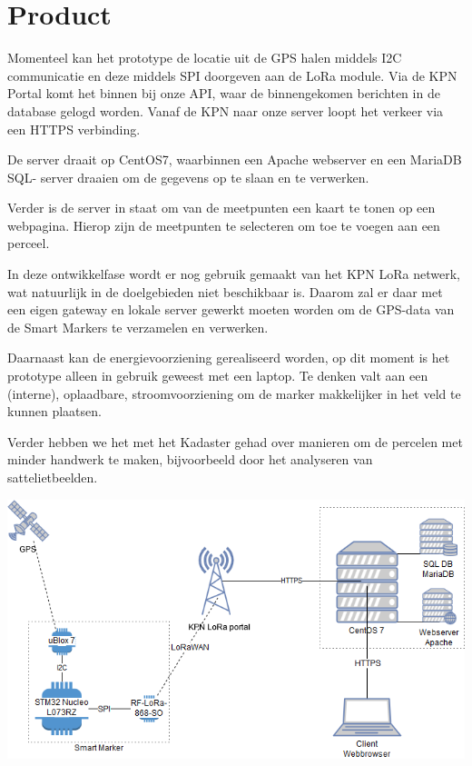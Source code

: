 \section{Product}
Momenteel kan het prototype de locatie uit de GPS halen middels I2C communicatie
en deze middels SPI doorgeven aan de LoRa module.
Via de KPN Portal komt het binnen bij onze API, waar de binnengekomen berichten
in de database gelogd worden. Vanaf de KPN naar onze server loopt het verkeer via
een HTTPS verbinding.

De server draait op CentOS7, waarbinnen een Apache webserver en een MariaDB SQL-
server draaien om de gegevens op te slaan en te verwerken.

Verder is de server in staat om van de meetpunten een kaart te tonen op een
webpagina. Hierop zijn de meetpunten te selecteren om toe te voegen aan een perceel.

In deze ontwikkelfase wordt er nog gebruik gemaakt van het KPN LoRa netwerk, wat
natuurlijk in de doelgebieden niet beschikbaar is. Daarom zal er daar met een
eigen gateway en lokale server gewerkt moeten worden om de GPS-data van de Smart
Markers te verzamelen en verwerken.


Daarnaast kan de energievoorziening gerealiseerd worden, op dit moment is het
prototype alleen in gebruik geweest met een laptop. Te denken valt aan een
(interne), oplaadbare, stroomvoorziening om de marker makkelijker in het veld te
kunnen plaatsen.

Verder hebben we het met het Kadaster gehad over manieren om de percelen met
minder handwerk te maken, bijvoorbeeld door het analyseren van sattelietbeelden.

\includegraphics[width=\linewidth]{final_report/All_parts.png}
